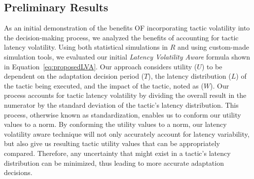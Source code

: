 \documentclass{article}
\newcommand{\todo}[1]{\textcolor{cyan}{\textbf{[#1]}}}
\begin{document}














\subsection{Preliminary Results}
As an initial demonstration of the benefits OF incorporating tactic volatility into the decision-making process, we analyzed the benefits of accounting for tactic latency volatility. Using both statistical simulations in $R$ and using custom-made simulation tools, we evaluated our initial \emph{Latency Volatility Aware} formula shown in Equation~\ref{eq:proposedLVA}. Our approach considers utility ($U$) to be dependent on the adaptation decision period ($T$), the latency distribution ($L$) of the tactic being executed, and the impact of the tactic, noted as ($W$). Our process accounts for tactic latency volatility by dividing the overall result in the numerator by the standard deviation of the tactic's latency distribution. This process, otherwise known as standardization, enables us to conform our utility values to a norm. By conforming the utility values to a norm, our latency volatility aware technique will not only accurately account for latency variability, but also give us resulting tactic utility values that can be appropriately compared. Therefore, any uncertainty that might exist in a tactic's latency distribution can be minimized, thus leading to more accurate adaptation decisions. 
\end{document}
